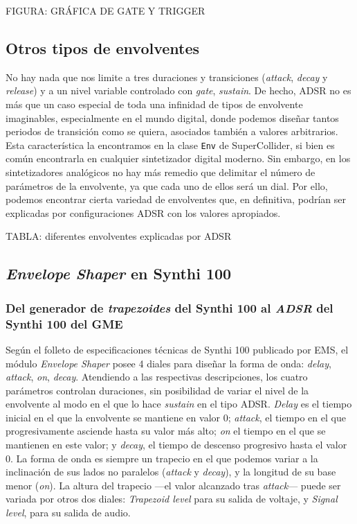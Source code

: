 FIGURA: GRÁFICA DE GATE Y TRIGGER

\subsection{Otros tipos de envolventes}

No hay nada que nos limite a tres duraciones y transiciones (\textit{attack}, \textit{decay} y \textit{release}) y a un nivel variable controlado con \textit{gate}, \textit{sustain}. De hecho, ADSR no es más que un caso especial de toda una infinidad de tipos de envolvente imaginables, especialmente en el mundo digital, donde podemos diseñar tantos periodos de transición como se quiera, asociados también a valores arbitrarios. Esta característica la encontramos en la clase \texttt{Env} de SuperCollider, si bien es común encontrarla en cualquier sintetizador digital moderno. Sin embargo, en los sintetizadores analógicos no hay más remedio que delimitar el número de parámetros de la envolvente, ya que cada uno de ellos será un dial. Por ello, podemos encontrar cierta variedad de envolventes que, en definitiva, podrían ser explicadas por configuraciones ADSR con los valores apropiados. 

TABLA: diferentes envolventes explicadas por ADSR

\subsection{\textit{Envelope Shaper} en Synthi 100}

\subsubsection{Del generador de \textit{trapezoides} del Synthi 100 al \textit{ADSR} del Synthi 100 del GME}

Según el folleto de especificaciones técnicas de Synthi 100 publicado por EMS, el módulo \textit{Envelope Shaper} posee 4 diales para diseñar la forma de onda: \textit{delay}, \textit{attack}, \textit{on}, \textit{decay}. Atendiendo a las respectivas descripciones, los cuatro parámetros controlan duraciones, sin posibilidad de variar el nivel de la envolvente al modo en el que lo hace \textit{sustain} en el tipo ADSR. \textit{Delay} es el tiempo inicial en el que la envolvente se mantiene en valor 0; \textit{attack}, el tiempo en el que progresivamente asciende hasta su valor más alto; \textit{on} el tiempo en el que se mantienen en este valor; y \textit{decay}, el tiempo de descenso progresivo hasta el valor 0. La forma de onda es siempre un trapecio en el que podemos variar a la inclinación de sus lados no paralelos (\textit{attack} y \textit{decay}), y la longitud de su base menor (\textit{on}). La altura del trapecio ---el valor alcanzado tras \textit{attack}--- puede ser variada por otros dos diales: \textit{Trapezoid level} para su salida de voltaje, y \textit{Signal level}, para su salida de audio.

